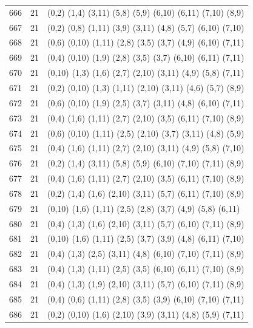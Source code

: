 \begin{appendix}
{\begin{longtable}{lll}
    666& 21 & (0,2)   (1,4)   (3,11)  (5,8)   (5,9)   (6,10)  (6,11)  (7,10)  (8,9)\\
    667& 21 & (0,2)   (0,8)   (1,11)  (3,9)   (3,11)  (4,8)   (5,7)   (6,10)  (7,10)\\
    668& 21 & (0,6)   (0,10)  (1,11)  (2,8)   (3,5)   (3,7)   (4,9)   (6,10)  (7,11)\\
    669& 21 & (0,4)   (0,10)  (1,9)   (2,8)   (3,5)   (3,7)   (6,10)  (6,11)  (7,11)\\
    670& 21 & (0,10)  (1,3)   (1,6)   (2,7)   (2,10)  (3,11)  (4,9)   (5,8)   (7,11)\\
    671& 21 & (0,2)   (0,10)  (1,3)   (1,11)  (2,10)  (3,11)  (4,6)   (5,7)   (8,9)\\
    672& 21 & (0,6)   (0,10)  (1,9)   (2,5)   (3,7)   (3,11)  (4,8)   (6,10)  (7,11)\\
    673& 21 & (0,4)   (1,6)   (1,11)  (2,7)   (2,10)  (3,5)   (6,11)  (7,10)  (8,9)\\
    674& 21 & (0,6)   (0,10)  (1,11)  (2,5)   (2,10)  (3,7)   (3,11)  (4,8)   (5,9)\\
    675& 21 & (0,4)   (1,6)   (1,11)  (2,7)   (2,10)  (3,11)  (4,9)   (5,8)   (7,10)\\
    676& 21 & (0,2)   (1,4)   (3,11)  (5,8)   (5,9)   (6,10)  (7,10)  (7,11)  (8,9)\\
    677& 21 & (0,4)   (1,6)   (1,11)  (2,7)   (2,10)  (3,5)   (6,11)  (7,10)  (8,9)\\
    678& 21 & (0,2)   (1,4)   (1,6)   (2,10)  (3,11)  (5,7)   (6,11)  (7,10)  (8,9)\\
    679& 21 & (0,10)  (1,6)   (1,11)  (2,5)   (2,8)   (3,7)   (4,9)   (5,8)   (6,11)\\
    680& 21 & (0,4)   (1,3)   (1,6)   (2,10)  (3,11)  (5,7)   (6,10)  (7,11)  (8,9)\\
    681& 21 & (0,10)  (1,6)   (1,11)  (2,5)   (3,7)   (3,9)   (4,8)   (6,11)  (7,10)\\
    682& 21 & (0,4)   (1,3)   (2,5)   (3,11)  (4,8)   (6,10)  (7,10)  (7,11)  (8,9)\\
    683& 21 & (0,4)   (1,3)   (1,11)  (2,5)   (3,5)   (6,10)  (6,11)  (7,10)  (8,9)\\
    684& 21 & (0,4)   (1,3)   (1,9)   (2,10)  (3,11)  (5,7)   (6,10)  (7,11)  (8,9)\\
    685& 21 & (0,4)   (0,6)   (1,11)  (2,8)   (3,5)   (3,9)   (6,10)  (7,10)  (7,11)\\
    686& 21 & (0,2)   (0,10)  (1,6)   (2,10)  (3,9)   (3,11)  (4,8)   (5,9)   (7,11)\\

\end{longtable}}
\end{appendix}
